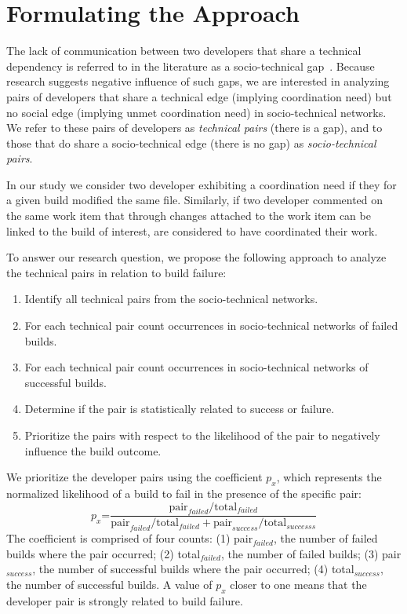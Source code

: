 \documentclass[conference]{IEEEtran}
\begin{document}


\section{Formulating the Approach}
The lack of communication between two developers that share a
technical dependency is referred to in the literature as a
socio-technical gap~\cite{valetto:msr:2007}. Because research suggests negative influence of such gaps, we are interested in analyzing pairs of developers that share a technical edge (implying coordination need) but no social edge (implying
unmet coordination need) in socio-technical networks. We refer to these pairs of
developers as \emph{technical pairs} (there is a gap), and to those that do
share a socio-technical edge (there is no gap) as \emph{socio-technical pairs}. 

In our study we consider two developer exhibiting a coordination need if they for a given build modified the same file.
Similarly, if two developer commented on the same work item that through changes attached to the work item can be linked to the build of interest, are considered to have coordinated their work.

To answer our research question, we propose the following approach to analyze the technical pairs in relation to build failure:

\begin{enumerate}
\item Identify all technical pairs from the socio-technical networks.
\item For each technical pair count occurrences in socio-technical networks of
failed builds.
\item For each technical pair count occurrences in socio-technical networks of
successful builds.
\item Determine if the pair is statistically related to success or failure.
\item Prioritize the pairs with respect to the likelihood of the pair to negatively influence the build outcome.
\end{enumerate}

We prioritize the developer pairs using the coefficient $p_x$,
which represents the normalized likelihood of a build
to fail in the presence of the specific pair:
$$
p_x\text{=}\frac{ \text{pair}_{failed} / \text{total}_{failed} }
                     { \text{pair}_{failed} / \text{total}_{failed} + \text{pair}_{success} / \text{total}_{successs}}
$$
The coefficient is comprised of four counts: (1) pair$_{failed}$, the number of failed builds where the pair occurred; (2) total$_{failed}$, the number of failed builds; (3) pair$_{success}$, the number of successful builds where the pair occurred; (4) total$_{success}$, the number of successful builds.
A value of $p_x$ closer to one means that the developer pair is strongly related to build
failure. 
\end{document}
